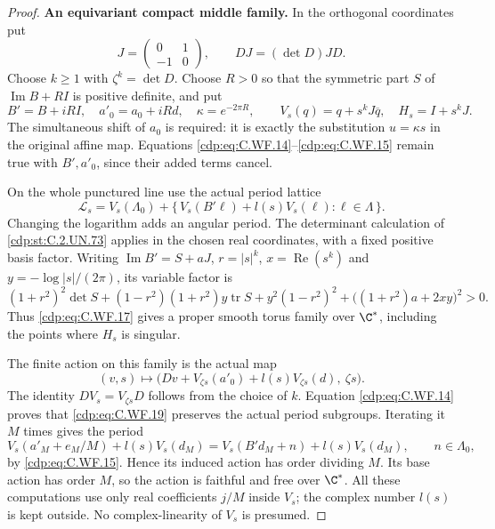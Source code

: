 \begin{proof}
\par\medskip\noindent\textbf{An equivariant compact middle family.}
In the orthogonal coordinates put
\[
 J=\begin{pmatrix}0&1\\-1&0\end{pmatrix},\qquad
 DJ=(\det D)JD.
\]
Choose \(k\ge1\) with \(\zeta^k=\det D\).
Choose \(R>0\) so that the symmetric part \(S\) of
\(\operatorname{Im}B+RI\) is positive definite, and put
\[
 B'=B+iRI,\quad a'_0=a_0+iRd,\quad
 \kappa=e^{-2\pi R},\qquad
 V_s(q)=q+s^kJ\overline q,\quad H_s=I+s^kJ.
\tag{C.WF.16}\label{cdp:eq:C.WF.16}
\]
The simultaneous shift of \(a_0\) is required: it is
exactly the substitution \(u=\kappa s\) in the original
affine map.  Equations \eqref{cdp:eq:C.WF.14}--\eqref{cdp:eq:C.WF.15} remain true
with \(B',a'_0\), since their added terms cancel.

On the whole punctured line use the actual period lattice
\[
 \mathcal L_s=V_s(\Lambda_0)+
       \{\,V_s(B'\ell)+l(s)V_s(\ell):\ell\in\Lambda\,\}.
\tag{C.WF.17}\label{cdp:eq:C.WF.17}
\]
Changing the logarithm adds an angular period.  The
determinant calculation of \ref{cdp:st:C.2.UN.73} applies in the chosen
real coordinates, with a fixed positive basis factor.
Writing \(\operatorname{Im}B'=S+aJ\),
\(r=|s|^k\), \(x=\operatorname{Re}(s^k)\) and
\(y=-\log|s|/(2\pi)\), its variable factor is
\[
 (1+r^2)^2\det S+(1-r^2)(1+r^2)y\operatorname{tr}S
 +y^2(1-r^2)^2+\bigl((1+r^2)a+2xy\bigr)^2>0 .
\tag{C.WF.18}\label{cdp:eq:C.WF.18}
\]
Thus \eqref{cdp:eq:C.WF.17} gives a proper smooth torus family over
\(\C^*\), including the points where \(H_s\) is singular.

The finite action on this family is the actual map
\[
 (v,s)\longmapsto
 \bigl(Dv+V_{\zeta s}(a'_0)
                  +l(s)V_{\zeta s}(d),\ \zeta s\bigr).
\tag{C.WF.19}\label{cdp:eq:C.WF.19}
\]
The identity \(DV_s=V_{\zeta s}D\) follows from the
choice of \(k\).  Equation \eqref{cdp:eq:C.WF.14} proves that
\eqref{cdp:eq:C.WF.19} preserves the actual period subgroups.
Iterating it \(M\) times gives the period
\[
 V_s(a'_M+e_M/M)+l(s)V_s(d_M)
       =V_s(B'd_M+n)+l(s)V_s(d_M),\qquad n\in\Lambda_0,
\tag{C.WF.20}\label{cdp:eq:C.WF.20}
\]
by \eqref{cdp:eq:C.WF.15}.  Hence its induced action has order
dividing \(M\).  Its base action has order \(M\), so
the action is faithful and free over \(\C^*\).
All these computations use only real coefficients
\(j/M\) inside \(V_s\); the complex number \(l(s)\)
is kept outside.  No complex-linearity of \(V_s\)
is presumed.


\end{proof}
